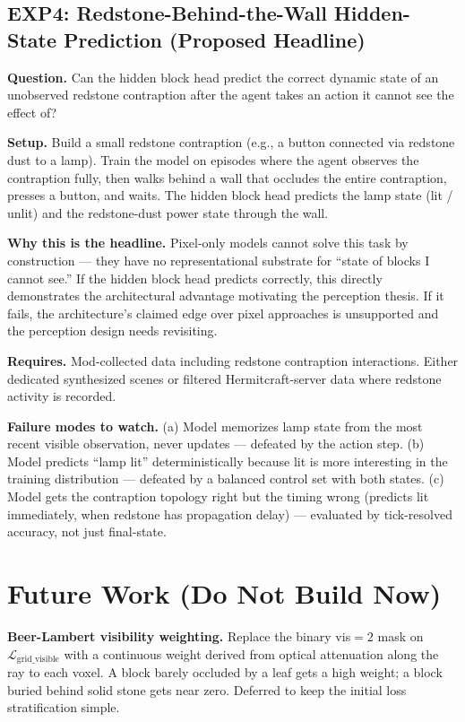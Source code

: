 \documentclass[11pt,a4paper]{article}
\begin{document}
\subsection{EXP4: Redstone-Behind-the-Wall Hidden-State Prediction (Proposed Headline)}

\textbf{Question.} Can the hidden block head predict the correct dynamic state of an unobserved redstone contraption after the agent takes an action it cannot see the effect of?

\textbf{Setup.} Build a small redstone contraption (e.g., a button connected via redstone dust to a lamp). Train the model on episodes where the agent observes the contraption fully, then walks behind a wall that occludes the entire contraption, presses a button, and waits. The hidden block head predicts the lamp state (lit / unlit) and the redstone-dust power state through the wall.

\textbf{Why this is the headline.} Pixel-only models cannot solve this task by construction --- they have no representational substrate for ``state of blocks I cannot see.'' If the hidden block head predicts correctly, this directly demonstrates the architectural advantage motivating the perception thesis. If it fails, the architecture's claimed edge over pixel approaches is unsupported and the perception design needs revisiting.

\textbf{Requires.} Mod-collected data including redstone contraption interactions. Either dedicated synthesized scenes or filtered Hermitcraft-server data where redstone activity is recorded.

\textbf{Failure modes to watch.} (a) Model memorizes lamp state from the most recent visible observation, never updates --- defeated by the action step. (b) Model predicts ``lamp lit'' deterministically because lit is more interesting in the training distribution --- defeated by a balanced control set with both states. (c) Model gets the contraption topology right but the timing wrong (predicts lit immediately, when redstone has propagation delay) --- evaluated by tick-resolved accuracy, not just final-state.

\section{Future Work (Do Not Build Now)}

\begin{futurework}
\textbf{Beer-Lambert visibility weighting.} Replace the binary vis$=2$ mask on $\mathcal{L}_\text{grid\_visible}$ with a continuous weight derived from optical attenuation along the ray to each voxel. A block barely occluded by a leaf gets a high weight; a block buried behind solid stone gets near zero. Deferred to keep the initial loss stratification simple.
\end{futurework}
\end{document}
